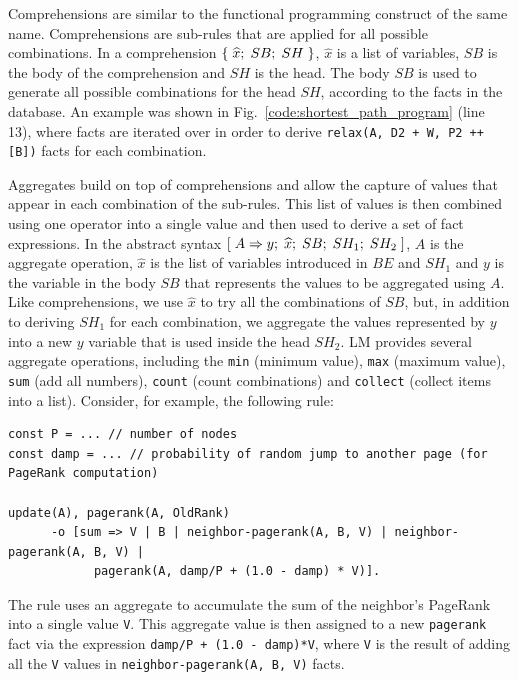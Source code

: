 Comprehensions are similar to the functional programming construct of the same
name.  Comprehensions are sub-rules that are applied for all possible
combinations. In a comprehension $\{ \; \widehat{x}; \; SB; \; SH \; \}$,
$\widehat{x}$ is a list of variables, $SB$ is the body of the comprehension and
$SH$ is the head. The body $SB$ is used to generate all possible combinations
for the head $SH$, according to the facts in the database.  An example was shown
in Fig.~\ref{code:shortest_path_program} (line 13), where  facts are iterated over in order to derive \texttt{relax(A, D2 + W, P2 ++
[B])} facts for each combination.

Aggregates build on top of comprehensions and allow the capture of values that
appear in each combination of the sub-rules. This list of values is then
combined using one operator into a single value and then used to derive a set of
fact expressions. In the abstract syntax
$[\; A \Rightarrow y; \; \widehat{x}; \; SB; \; SH_1; \; SH_2 \;]$, $A$ is the aggregate operation,
$\widehat{x}$ is the list of variables introduced in $BE$ and $SH_1$ and $y$ is
the variable in the body $SB$ that represents the values to be aggregated using
$A$. Like comprehensions, we use $\widehat{x}$ to try all the combinations of
$SB$, but, in addition to deriving $SH_1$ for each combination, we aggregate the
values represented by $y$ into a new $y$ variable that is used inside the head
$SH_2$.  LM provides several aggregate operations, including the \texttt{min}
(minimum value), \texttt{max} (maximum value), \texttt{sum} (add all numbers),
\texttt{count} (count combinations) and \texttt{collect} (collect items into a
list). Consider, for example, the following rule:

\begin{Verbatim}[fontsize=\scriptsize]
const P = ... // number of nodes
const damp = ... // probability of random jump to another page (for PageRank computation)

update(A), pagerank(A, OldRank)
      -o [sum => V | B | neighbor-pagerank(A, B, V) | neighbor-pagerank(A, B, V) |
            pagerank(A, damp/P + (1.0 - damp) * V)].
\end{Verbatim}

The rule uses an aggregate to accumulate the sum of the neighbor's PageRank into
a single value \texttt{V}. This aggregate value is then assigned to a new
\texttt{pagerank} fact via the expression \texttt{damp/P + (1.0 - damp)*V},
where \texttt{V} is the result of adding all the \texttt{V} values in
\texttt{neighbor-pagerank(A, B, V)} facts.
